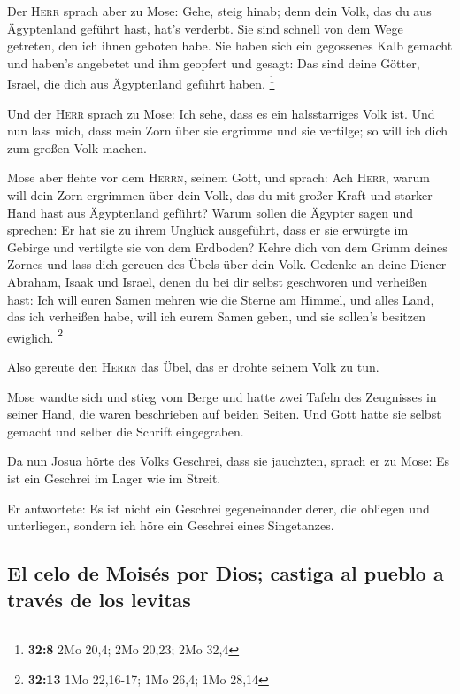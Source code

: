  Der \textsc{Herr} sprach aber zu Mose: Gehe, steig hinab;
denn dein Volk, das du aus Ägyptenland geführt hast, hat's verderbt.
 Sie sind schnell von dem Wege getreten, den ich ihnen
geboten habe. Sie haben sich ein gegossenes Kalb gemacht und haben's
angebetet und ihm geopfert und gesagt: Das sind deine Götter, Israel,
die dich aus Ägyptenland geführt haben. \footnote{\textbf{32:8} 2Mo
  20,4; 2Mo 20,23; 2Mo 32,4}

 Und der \textsc{Herr} sprach zu Mose: Ich sehe, dass es
ein halsstarriges Volk ist.  Und nun lass mich, dass mein
Zorn über sie ergrimme und sie vertilge; so will ich dich zum großen
Volk machen.

 Mose aber flehte vor dem \textsc{Herrn}, seinem Gott,
und sprach: Ach \textsc{Herr}, warum will dein Zorn ergrimmen über dein
Volk, das du mit großer Kraft und starker Hand hast aus Ägyptenland
geführt?  Warum sollen die Ägypter sagen und sprechen: Er
hat sie zu ihrem Unglück ausgeführt, dass er sie erwürgte im Gebirge und
vertilgte sie von dem Erdboden? Kehre dich von dem Grimm deines Zornes
und lass dich gereuen des Übels über dein Volk.  Gedenke
an deine Diener Abraham, Isaak und Israel, denen du bei dir selbst
geschworen und verheißen hast: Ich will euren Samen mehren wie die
Sterne am Himmel, und alles Land, das ich verheißen habe, will ich eurem
Samen geben, und sie sollen's besitzen ewiglich. \footnote{\textbf{32:13}
  1Mo 22,16-17; 1Mo 26,4; 1Mo 28,14}

 Also gereute den \textsc{Herrn} das Übel, das er drohte
seinem Volk zu tun.

 Mose wandte sich und stieg vom Berge und hatte zwei
Tafeln des Zeugnisses in seiner Hand, die waren beschrieben auf beiden
Seiten.  Und Gott hatte sie selbst gemacht und selber die
Schrift eingegraben.

 Da nun Josua hörte des Volks Geschrei, dass sie
jauchzten, sprach er zu Mose: Es ist ein Geschrei im Lager wie im
Streit.

 Er antwortete: Es ist nicht ein Geschrei gegeneinander
derer, die obliegen und unterliegen, sondern ich höre ein Geschrei eines
Singetanzes.

\hypertarget{el-celo-de-moisuxe9s-por-dios-castiga-al-pueblo-a-travuxe9s-de-los-levitas}{%
\subsection{El celo de Moisés por Dios; castiga al pueblo a través de
los
levitas}\label{el-celo-de-moisuxe9s-por-dios-castiga-al-pueblo-a-travuxe9s-de-los-levitas}}

